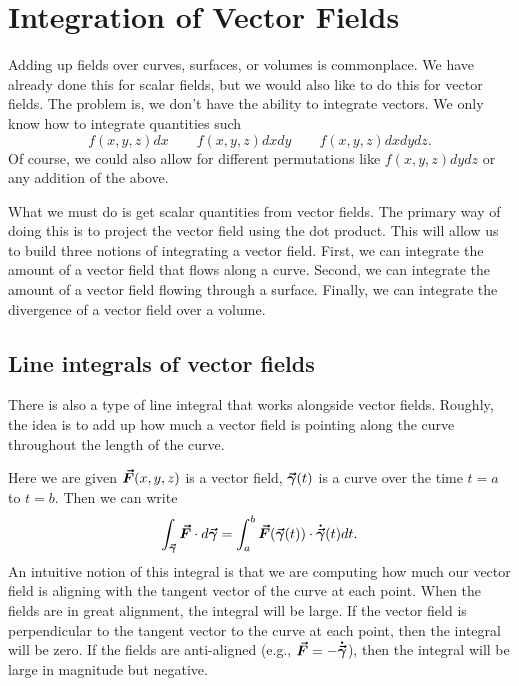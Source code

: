        
        
       \section{Integration of Vector Fields}
       Adding up fields over curves, surfaces, or volumes is commonplace. We have already done this for scalar fields, but we would also like to do this for vector fields. The problem is, we don't have the ability to integrate vectors.  We only know how to integrate quantities such
       \[
       f(x,y,z)dx \qquad f(x,y,z)dxdy \qquad f(x,y,z)dxdydz.
       \]
       Of course, we could also allow for different permutations like $f(x,y,z)dydz$ or any addition of the above. 
       
       What we must do is get scalar quantities from vector fields.  The primary way of doing this is to project the vector field using the dot product.  This will allow us to build three notions of integrating a vector field.  First, we can integrate the amount of a vector field that flows along a curve. Second, we can integrate the amount of a vector field flowing through a surface. Finally, we can integrate the divergence of a vector field over a volume.
       
        \subsection{Line integrals of vector fields}
        
        There is also a type of line integral that works alongside vector fields.  Roughly, the idea is to add up how much a vector field is pointing along the curve throughout the length of the curve.  
        
        Here we are given $\boldsymbol{\vec{F}}(x,y,z)$ is a vector field, $\boldsymbol{\vec{\gamma}}(t)$ is a curve over the time $t=a$ to $t=b$.  Then we can write
        \[
        \int_{\boldsymbol{\vec{\gamma}}} \boldsymbol{\vec{F}} \cdot d\boldsymbol{\vec{\gamma}} =\int_a^b \boldsymbol{\vec{F}}(\boldsymbol{\vec{\gamma}}(t))\cdot \boldsymbol{\dot{\vec{\gamma}}}(t) dt.
        \]
        An intuitive notion of this integral is that we are computing how much our vector field is aligning with the tangent vector of the curve at each point.  When the fields are in great alignment, the integral will be large.  If the vector field is perpendicular to the tangent vector to the curve at each point, then the integral will be zero.  If the fields are anti-aligned (e.g., $\boldsymbol{\vec{F}} = -\boldsymbol{\dot{\vec{\gamma}}}$), then the integral will be large in magnitude but negative.
        
